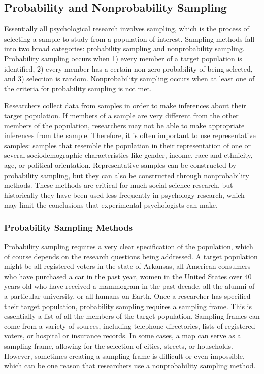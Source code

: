 \documentclass[
]{krantz}
\begin{document}
\subsection*{Probability and Nonprobability Sampling}\label{probability-and-nonprobability-sampling}


Essentially all psychological research involves sampling, which is the process of selecting a sample to study from a population of interest. Sampling methods fall into two broad categories: probability sampling and nonprobability sampling. \hyperref[probability-sampling]{Probability sampling} occurs when 1) every member of a target population is identified, 2) every member has a certain non-zero probability of being selected, and 3) selection is random. \hyperref[nonprobability-sampling]{Nonprobability sampling} occurs when at least one of the criteria for probability sampling is not met.

Researchers collect data from samples in order to make inferences about their target population. If members of a sample are very different from the other members of the population, researchers may not be able to make appropriate inferences from the sample. Therefore, it is often important to use representative samples: samples that resemble the population in their representation of one or several sociodemographic characteristics like gender, income, race and ethnicity, age, or political orientation. Representative samples can be constructed by probability sampling, but they can also be constructed through nonprobability methods. These methods are critical for much social science research, but historically they have been used less frequently in psychology research, which may limit the conclusions that experimental psychologists can make.

\subsubsection*{Probability Sampling Methods}\label{probability-sampling-methods}


Probability sampling requires a very clear specification of the population, which of course depends on the research questions being addressed. A target population might be all registered voters in the state of Arkansas, all American consumers who have purchased a car in the past year, women in the United States over 40 years old who have received a mammogram in the past decade, all the alumni of a particular university, or all humans on Earth. Once a researcher has specified their target population, probability sampling requires a \hyperref[sampling-frame]{sampling frame}. This is essentially a list of all the members of the target population. Sampling frames can come from a variety of sources, including telephone directories, lists of registered voters, or hospital or insurance records. In some cases, a map can serve as a sampling frame, allowing for the selection of cities, streets, or households. However, sometimes creating a sampling frame is difficult or even impossible, which can be one reason that researchers use a nonprobability sampling method.
\end{document}
